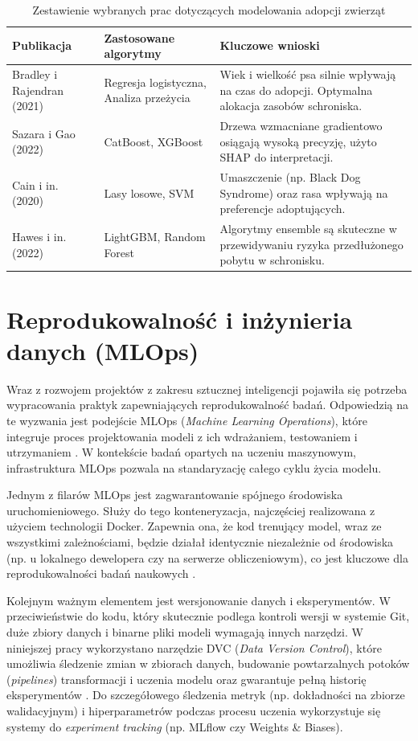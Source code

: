 \begin{table}[htbp]
\centering
\caption{Zestawienie wybranych prac dotyczących modelowania adopcji zwierząt}
\label{tab:related_works}
\begin{tabular}{|p{3.5cm}|p{3.5cm}|p{7cm}|}
\hline
\textbf{Publikacja} & \textbf{Zastosowane algorytmy} & \textbf{Kluczowe wnioski} \\ \hline
Bradley i Rajendran (2021) \cite{Bradley2021} & Regresja logistyczna, Analiza przeżycia & Wiek i wielkość psa silnie wpływają na czas do adopcji. Optymalna alokacja zasobów schroniska. \\ \hline
Sazara i Gao (2022) \cite{Sazara2022} & CatBoost, XGBoost & Drzewa wzmacniane gradientowo osiągają wysoką precyzję, użyto SHAP do interpretacji. \\ \hline
Cain i in. (2020) \cite{Cain2020} & Lasy losowe, SVM & Umaszczenie (np. Black Dog Syndrome) oraz rasa wpływają na preferencje adoptujących. \\ \hline
Hawes i in. (2022) \cite{Hawes2022} & LightGBM, Random Forest & Algorytmy ensemble są skuteczne w przewidywaniu ryzyka przedłużonego pobytu w schronisku. \\ \hline
\end{tabular}
\end{table}

\section{Reprodukowalność i inżynieria danych (MLOps)}

Wraz z rozwojem projektów z zakresu sztucznej inteligencji pojawiła się potrzeba wypracowania praktyk zapewniających reprodukowalność badań. Odpowiedzią na te wyzwania jest podejście MLOps (\textit{Machine Learning Operations}), które integruje proces projektowania modeli z ich wdrażaniem, testowaniem i utrzymaniem \cite{Sculley2015}. W kontekście badań opartych na uczeniu maszynowym, infrastruktura MLOps pozwala na standaryzację całego cyklu życia modelu.

Jednym z filarów MLOps jest zagwarantowanie spójnego środowiska uruchomieniowego. Służy do tego konteneryzacja, najczęściej realizowana z użyciem technologii Docker. Zapewnia ona, że kod trenujący model, wraz ze wszystkimi zależnościami, będzie działał identycznie niezależnie od środowiska (np. u lokalnego dewelopera czy na serwerze obliczeniowym), co jest kluczowe dla reprodukowalności badań naukowych \cite{Merkel2014}. 

Kolejnym ważnym elementem jest wersjonowanie danych i eksperymentów. W przeciwieństwie do kodu, który skutecznie podlega kontroli wersji w systemie Git, duże zbiory danych i binarne pliki modeli wymagają innych narzędzi. W niniejszej pracy wykorzystano narzędzie DVC (\textit{Data Version Control}), które umożliwia śledzenie zmian w zbiorach danych, budowanie powtarzalnych potoków (\emph{pipelines}) transformacji i uczenia modelu oraz gwarantuje pełną historię eksperymentów \cite{Kuprieiev2024}. Do szczegółowego śledzenia metryk (np. dokładności na zbiorze walidacyjnym) i hiperparametrów podczas procesu uczenia wykorzystuje się systemy do \emph{experiment tracking} (np. MLflow czy Weights \& Biases).

